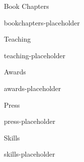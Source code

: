 \begin{cvSection}{Book Chapters}

{{bookchapters-placeholder}}

\end{cvSection}


\begin{cvSection}{Teaching}

{{teaching-placeholder}}

\end{cvSection}


\begin{cvSection}{Awards}

{{awards-placeholder}}

\end{cvSection}


\begin{cvSection}{Press}

{{press-placeholder}}

\end{cvSection}


\begin{cvSection}{Skills}

{{skills-placeholder}}

\end{cvSection}



